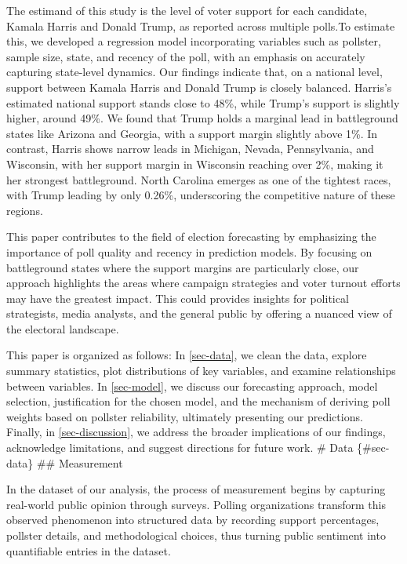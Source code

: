 \documentclass[
  letterpaper,
  DIV=11,
  numbers=noendperiod]{scrartcl}
\begin{document}
The estimand of this study is the level of voter support for each
candidate, Kamala Harris and Donald Trump, as reported across multiple
polls.To estimate this, we developed a regression model incorporating
variables such as pollster, sample size, state, and recency of the poll,
with an emphasis on accurately capturing state-level dynamics. Our
findings indicate that, on a national level, support between Kamala
Harris and Donald Trump is closely balanced. Harris's estimated national
support stands close to 48\%, while Trump's support is slightly higher,
around 49\%. We found that Trump holds a marginal lead in battleground
states like Arizona and Georgia, with a support margin slightly above
1\%. In contrast, Harris shows narrow leads in Michigan, Nevada,
Pennsylvania, and Wisconsin, with her support margin in Wisconsin
reaching over 2\%, making it her strongest battleground. North Carolina
emerges as one of the tightest races, with Trump leading by only 0.26\%,
underscoring the competitive nature of these regions.

This paper contributes to the field of election forecasting by
emphasizing the importance of poll quality and recency in prediction
models. By focusing on battleground states where the support margins are
particularly close, our approach highlights the areas where campaign
strategies and voter turnout efforts may have the greatest impact. This
could provides insights for political strategists, media analysts, and
the general public by offering a nuanced view of the electoral
landscape.

This paper is organized as follows: In \ref{sec-data}, we clean the
data, explore summary statistics, plot distributions of key variables,
and examine relationships between variables. In \ref{sec-model}, we
discuss our forecasting approach, model selection, justification for the
chosen model, and the mechanism of deriving poll weights based on
pollster reliability, ultimately presenting our predictions. Finally, in
\ref{sec-discussion}, we address the broader implications of our
findings, acknowledge limitations, and suggest directions for future
work. \vspace{0.7cm} \# Data \{\#sec-data\} \vspace{0.7cm} \#\#
Measurement

In the dataset of our analysis, the process of measurement begins by
capturing real-world public opinion through surveys. Polling
organizations transform this observed phenomenon into structured data by
recording support percentages, pollster details, and methodological
choices, thus turning public sentiment into quantifiable entries in the
dataset.
\end{document}
